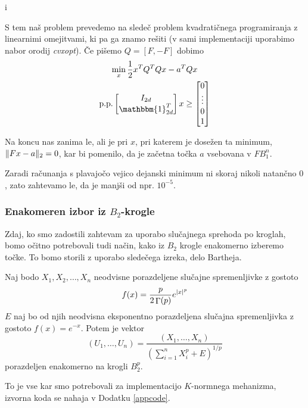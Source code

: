 i\documentclass[mat1]{fmfdelo}
\DeclarePairedDelimiter{\abs}{\lvert}{\rvert}
\DeclarePairedDelimiter{\norm}{\lVert}{\rVert}
\DeclareMathOperator{\gfn}{\Gamma}
\begin{document}
S tem naš problem prevedemo na sledeč problem kvadratičnega programiranja z linearnimi omejitvami, ki pa ga znamo rešiti (v sami implementaciji uporabimo nabor orodij {\em cvxopt}). Če pišemo $Q=[F, -F]$ dobimo
\begin{equation*}
    \begin{gathered}
        \min_x \frac{1}{2} x^TQ^TQx - a^TQx \\
        \text{p.p.} 
        \begin{bmatrix} 
            I_{2d} \\
            \mathbbm{1}_{2d}^T
        \end{bmatrix}x \geq
        \begin{bmatrix} 
            0 \\
            \vdots \\
            0 \\
            1
        \end{bmatrix}
    \end{gathered}
\end{equation*}

Na koncu nas zanima le, ali je pri $x$, pri katerem je dosežen ta minimum, $\norm{Fx-a}_2=0$, kar bi pomenilo, da je začetna točka $a$ vsebovana v $FB_1^n$.
\begin{opomba}
    Zaradi računanja s plavajočo vejico dejanski minimum ni skoraj nikoli natančno $0$, zato zahtevamo le, da je manjši od npr. $10^{-5}$.
\end{opomba}

\subsubsection{Enakomeren izbor iz $B_2$-krogle}
Zdaj, ko smo zadostili zahtevam za uporabo slučajnega sprehoda po kroglah, bomo očitno potrebovali tudi način, kako iz $B_2$ krogle enakomerno izberemo točke. To bomo storili z uporabo sledečega izreka, delo Bartheja.

\begin{izrek}
    Naj bodo $X_1, X_2, \dots, X_n$ neodvisne porazdeljene slučajne spremenljivke z gostoto
    \begin{equation*}
        f(x) = \frac{p}{2\gfn(p)} e^{\abs{x}^p}
    \end{equation*}
    $E$ naj bo od njih neodvisna eksponentno porazdeljena slučajna spremenljivka z gostoto $f(x)=e^{-x}$. Potem je vektor
    \begin{equation*}
        (U_1,\dots,U_n) = \frac{(X_1,\dots,X_n)}{(\sum_{i=1}^n X_i^p + E)^{1/p}}
    \end{equation*}
    porazdeljen enakomerno na krogli $B_2^p$.
\end{izrek}
To je vse kar smo potrebovali za implementacijo $K$-normnega mehanizma, izvorna koda se nahaja v Dodatku \ref{appcode}.
\end{document}
